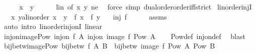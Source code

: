 \begin{isabellebody}
\ \ \isamarkupfalse%
\ \isamarkupfalse%
\ {\isachardoublequoteopen}x\ {\isacharequal}{\kern0pt}\ y{\isachardoublequoteclose}\isanewline
\ \ \ \ \isamarkupfalse%
\ lin\ {\isacharbrackleft}{\kern0pt}of\ x\ y{\isacharbrackright}{\kern0pt}\ ne\ \isamarkupfalse%
\ {\isacharparenleft}{\kern0pt}force\ simp{\isacharcolon}{\kern0pt}\ dual{\isacharunderscore}{\kern0pt}order{\isachardot}{\kern0pt}order{\isacharunderscore}{\kern0pt}iff{\isacharunderscore}{\kern0pt}strict{\isacharparenright}{\kern0pt}\isanewline
{}\isamarkupfalse%
%
\endisatagproof
{\isafoldproof}%
%
\isadelimproof
\isanewline
%
\endisadelimproof
\isanewline
{}\isamarkupfalse%
\ linorder{\isacharunderscore}{\kern0pt}injI{\isacharcolon}{\kern0pt}\isanewline
\ \ \ {\isachardoublequoteopen}{\isasymAnd}x\ y{\isacharcolon}{\kern0pt}{\isacharcolon}{\kern0pt}{\isacharprime}{\kern0pt}a{\isacharcolon}{\kern0pt}{\isacharcolon}{\kern0pt}linorder{\isachardot}{\kern0pt}\ x\ {\isacharless}{\kern0pt}\ y\ {\isasymLongrightarrow}\ f\ x\ {\isasymnoteq}\ f\ y{\isachardoublequoteclose}\isanewline
\ \ \ {\isachardoublequoteopen}inj\ f{\isachardoublequoteclose}\isanewline
\ \ \ \ %
\isanewline
%
\isadelimproof
%
\endisadelimproof
%
\isatagproof
{}\isamarkupfalse%
\ assms\ \isamarkupfalse%
\ {\isacharparenleft}{\kern0pt}auto\ intro{\isacharcolon}{\kern0pt}\ linorder{\isacharunderscore}{\kern0pt}inj{\isacharunderscore}{\kern0pt}onI\ linear{\isacharparenright}{\kern0pt}%
\endisatagproof
{\isafoldproof}%
%
\isadelimproof
\isanewline
%
\endisadelimproof
\isanewline
{}\isamarkupfalse%
\ inj{\isacharunderscore}{\kern0pt}on{\isacharunderscore}{\kern0pt}image{\isacharunderscore}{\kern0pt}Pow{\isacharcolon}{\kern0pt}\ {\isachardoublequoteopen}inj{\isacharunderscore}{\kern0pt}on\ f\ A\ {\isasymLongrightarrow}inj{\isacharunderscore}{\kern0pt}on\ {\isacharparenleft}{\kern0pt}image\ f{\isacharparenright}{\kern0pt}\ {\isacharparenleft}{\kern0pt}Pow\ A{\isacharparenright}{\kern0pt}{\isachardoublequoteclose}\isanewline
%
\isadelimproof
\ \ %
\endisadelimproof
%
\isatagproof
{}\isamarkupfalse%
\ Pow{\isacharunderscore}{\kern0pt}def\ inj{\isacharunderscore}{\kern0pt}on{\isacharunderscore}{\kern0pt}def\ \isamarkupfalse%
\ blast%
\endisatagproof
{\isafoldproof}%
%
\isadelimproof
\isanewline
%
\endisadelimproof
\isanewline
{}\isamarkupfalse%
\ bij{\isacharunderscore}{\kern0pt}betw{\isacharunderscore}{\kern0pt}image{\isacharunderscore}{\kern0pt}Pow{\isacharcolon}{\kern0pt}\ {\isachardoublequoteopen}bij{\isacharunderscore}{\kern0pt}betw\ f\ A\ B\ {\isasymLongrightarrow}\ bij{\isacharunderscore}{\kern0pt}betw\ {\isacharparenleft}{\kern0pt}image\ f{\isacharparenright}{\kern0pt}\ {\isacharparenleft}{\kern0pt}Pow\ A{\isacharparenright}{\kern0pt}\ {\isacharparenleft}{\kern0pt}Pow\ B{\isacharparenright}{\kern0pt}{\isachardoublequoteclose}\isanewline

\end{isabellebody}
